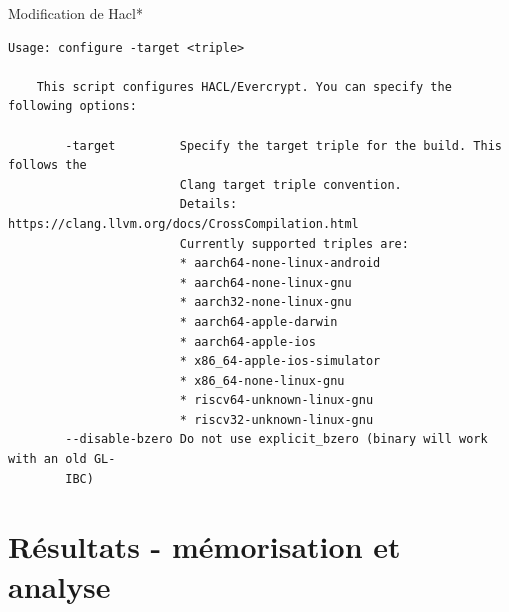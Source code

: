 \documentclass[A4,svgnames,9pt,aspectratio=169]{beamer}
\begin{document}
\begin{frame}[fragile]{Modification de Hacl*}

  \begin{lstlisting}[style=global2, caption={./configure}, gobble=4]
    Usage: configure -target <triple>

    This script configures HACL/Evercrypt. You can specify the following options:

        -target         Specify the target triple for the build. This follows the
                        Clang target triple convention.
                        Details: https://clang.llvm.org/docs/CrossCompilation.html
                        Currently supported triples are:
                        * aarch64-none-linux-android
                        * aarch64-none-linux-gnu
                        * aarch32-none-linux-gnu
                        * aarch64-apple-darwin
                        * aarch64-apple-ios
                        * x86_64-apple-ios-simulator
                        * x86_64-none-linux-gnu
                        * riscv64-unknown-linux-gnu
                        * riscv32-unknown-linux-gnu
        --disable-bzero Do not use explicit_bzero (binary will work with an old GL-
        IBC)
  \end{lstlisting}
\end{frame}



\section{Résultats - mémorisation et analyse}
\frame{\sectionpage}
\end{document}
